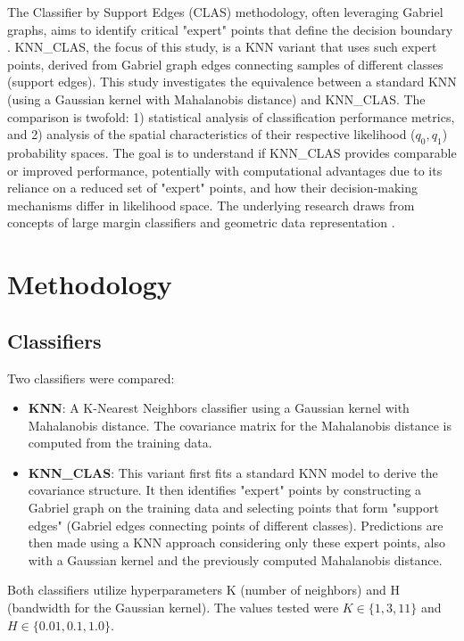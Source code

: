\documentclass[conference]{IEEEtran}
\begin{document}
The Classifier by Support Edges (CLAS) methodology, often leveraging Gabriel graphs, aims to identify critical "expert" points that define the decision boundary \cite{torres2016, souza2019, arias2021, arias2024}. KNN\_CLAS, the focus of this study, is a KNN variant that uses such expert points, derived from Gabriel graph edges connecting samples of different classes (support edges). This study investigates the equivalence between a standard KNN (using a Gaussian kernel with Mahalanobis distance) and KNN\_CLAS. The comparison is twofold: 1) statistical analysis of classification performance metrics, and 2) analysis of the spatial characteristics of their respective likelihood ($q_0, q_1$) probability spaces. The goal is to understand if KNN\_CLAS provides comparable or improved performance, potentially with computational advantages due to its reliance on a reduced set of "expert" points, and how their decision-making mechanisms differ in likelihood space. The underlying research draws from concepts of large margin classifiers and geometric data representation \cite{torres2015, torres2021, torres2015b}.

\section{Methodology}
\subsection{Classifiers}
Two classifiers were compared:
\begin{itemize}
    \item \textbf{KNN}: A K-Nearest Neighbors classifier using a Gaussian kernel with Mahalanobis distance. The covariance matrix for the Mahalanobis distance is computed from the training data.
    \item \textbf{KNN\_CLAS}: This variant first fits a standard KNN model to derive the covariance structure. It then identifies "expert" points by constructing a Gabriel graph on the training data and selecting points that form "support edges" (Gabriel edges connecting points of different classes). Predictions are then made using a KNN approach considering only these expert points, also with a Gaussian kernel and the previously computed Mahalanobis distance.
\end{itemize}
Both classifiers utilize hyperparameters K (number of neighbors) and H (bandwidth for the Gaussian kernel). The values tested were $K \in \{1, 3, 11\}$ and $H \in \{0.01, 0.1, 1.0\}$.
\end{document}
